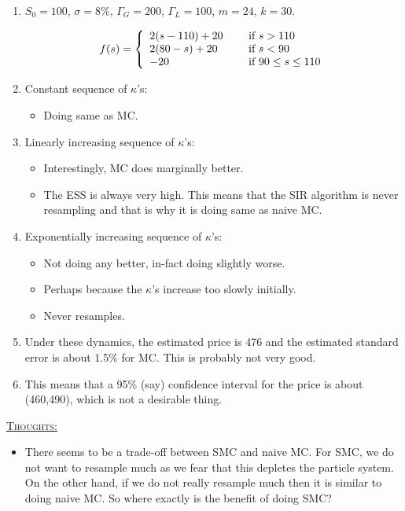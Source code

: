 \documentclass{article}
\begin{document}
\begin{enumerate}

\item $S_{0} = 100$, $\sigma = 8 \%$,  $\Gamma_{G} = 200$, $\Gamma_{L} = 100$,  $m = 24$, $k = 30$.

\[f(s) = \left\{ 
  \begin{array}{l l}
    2(s-110) + 20 & \quad \text{ if } s > 110 \\
   2(80-s) + 20 & \quad \text{ if } s < 90 \\
   -20 & \quad \text{ if } 90 \leq s \leq 110
  \end{array} \right.\]

\item Constant sequence of $\kappa$'s:
\begin{itemize}
\item Doing same as MC.
\end{itemize}

\item Linearly increasing sequence of $\kappa$'s:
\begin{itemize}
\item Interestingly, MC does marginally better.
\item The ESS is always very high. This means that the SIR algorithm is never resampling and that is why it is doing same as naive MC.
\end{itemize}

\item Exponentially increasing sequence of $\kappa$'s:
\begin{itemize}
\item Not doing any better, in-fact doing slightly worse. 
\item Perhaps because the $\kappa$'s increase too slowly initially.
\item Never resamples.
\end{itemize}

\item Under these dynamics, the estimated price is 476 and the estimated standard error is about 1.5\% for MC. This is probably not very good.

\item This means that a 95\% (say) confidence interval for the price is about (460,490), which is not a desirable thing. 

\end{enumerate} 

\underline{\textsc{Thoughts:}}

\begin{itemize}

\item There seems to be a trade-off between SMC and naive MC. For SMC, we do not want to resample much as we fear that this depletes the particle system. On the other hand, if we do not really resample much then it is similar to doing naive MC. So where exactly is the benefit of doing SMC? 

\end{itemize}
\end{document}
